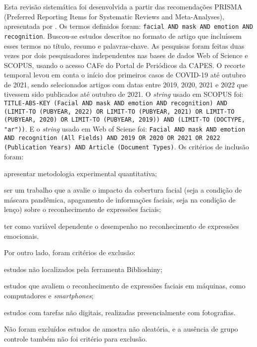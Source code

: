 \documentclass[portuguese]{textolivre}
\begin{document}
Esta revisão sistemática foi desenvolvida a partir das recomendações PRISMA (Preferred Reporting Items for Systematic Reviews and Meta-Analyses), apresentada por \textcite{galvao_revisao_2019}. Os termos definidos foram: \texttt{facial AND mask AND emotion AND recognition}. Buscou-se estudos descritos no formato de artigo que incluíssem esses termos no título, resumo e palavras-chave. As pesquisas foram feitas duas vezes por dois pesquisadores independentes nas bases de dados Web of Science e SCOPUS, usando o acesso CAFe do Portal de Periódicos da CAPES. O recorte temporal levou em conta o início dos primeiros casos de COVID-19 até outubro de 2021, sendo selecionados artigos com datas entre 2019, 2020, 2021 e 2022 que tivessem sido publicados até outubro de 2021. O \textit{string} usado em SCOPUS foi: \texttt{TITLE-ABS-KEY (Facial AND mask AND emotion AND recognition) AND  (LIMIT-TO (PUBYEAR,  2022)  OR  LIMIT-TO (PUBYEAR, 2021)  OR  LIMIT-TO (PUBYEAR, 2020)  OR  LIMIT-TO (PUBYEAR, 2019))  AND  (LIMIT-TO (DOCTYPE, "ar"))}. E o \textit{string} usado em Web of Sciene foi: \texttt{Facial AND mask AND emotion AND recognition (All Fields) AND 2019 OR 2020 OR 2021 OR 2022 (Publication Years) AND Article (Document Types)}. Os critérios de inclusão foram: 
\begin{enumerate*}[label=\emph{\alph*})] 
  \item apresentar metodologia experimental quantitativa;
  \item ser um trabalho que a avalie o impacto da cobertura facial (seja a condição de máscara pandêmica, apagamento de informações faciais, seja na condição de lenço) sobre o reconhecimento de expressões faciais;
  \item ter como variável dependente o desempenho no reconhecimento de expressões emocionais.
\end{enumerate*}
Por outro lado, foram critérios de exclusão: 
\begin{enumerate*}[label=\emph{\alph*})] 
  \item estudos não localizados pela ferramenta Biblioshiny; 
  \item estudos que avaliem o reconhecimento de expressões faciais em máquinas, como computadores e \textit{smartphones}; 
  \item estudos com tarefas não digitais, realizadas presencialmente com fotografias. 
\end{enumerate*}
Não foram excluídos estudos de amostra não aleatória, e a ausência de grupo controle também não foi critério para exclusão.
\end{document}

